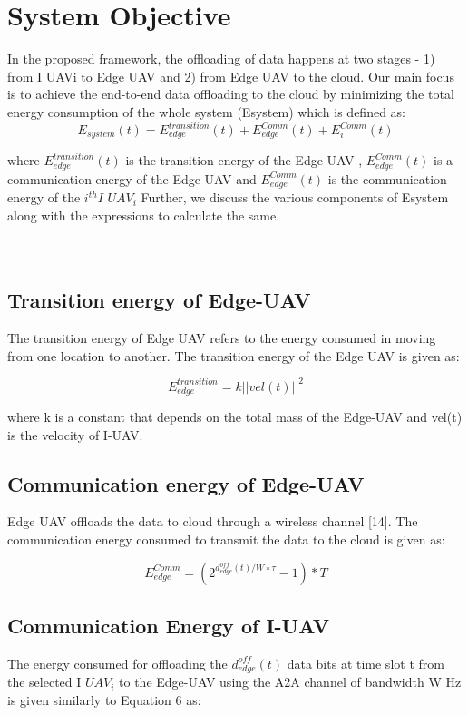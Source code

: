 \documentclass[11pt,twocolumn]{article}
\begin{document}
\section{System Objective}
In the proposed framework, the offloading of data happens at two stages - 1) from I UAVi to Edge UAV and 2) from Edge UAV to the cloud. Our main focus is to achieve the end-to-end data offloading to the cloud by minimizing the total energy consumption of the whole system (Esystem)
which is defined as:
\begin{equation}
    E_{system}(t) = E_{edge}^{transition}(t) + E_{edge}^{Comm}(t) +  E_{i}^{Comm}(t) 
\end{equation}

where $E_{edge}^{transition}(t)$ is the transition energy of the Edge UAV , $E_{edge}^{Comm}(t)$ is a communication energy of the Edge UAV and $E_{edge}^{Comm}(t)$ is the communication energy of the $i^{th}I$ $UAV_{i}$ Further, we discuss the various components of Esystem
along with the expressions to calculate the same.\cite{harnad2004access}
\\ \\\\
\subsection{Transition energy of Edge-UAV}
The transition energy of Edge UAV refers to the energy consumed in moving from one location to another. The transition energy of the Edge UAV is given as:

\begin{equation}
    E_{edge}^{transition} = k||vel(t)||^{2}
\end{equation}

where k is a constant that depends on the total mass of the Edge-UAV and vel(t) is the velocity of I-UAV.

\subsection{Communication energy of Edge-UAV}
Edge UAV offloads the data to cloud through a wireless channel [14]. The communication energy consumed to transmit the data to the cloud is given as:

\begin{equation}
    E_{edge}^{Comm}= (2^{d_{edge}^{off}(t)/W∗τ} - 1)*T
\end{equation}

\subsection{Communication Energy of I-UAV}
The energy consumed for offloading the ${d_{edge}^{off}(t)}$ data bits at time slot t from the selected I $UAV_{i}$ to the Edge-UAV using the A2A channel of bandwidth W Hz is given similarly to Equation 6 as:
\end{document}
